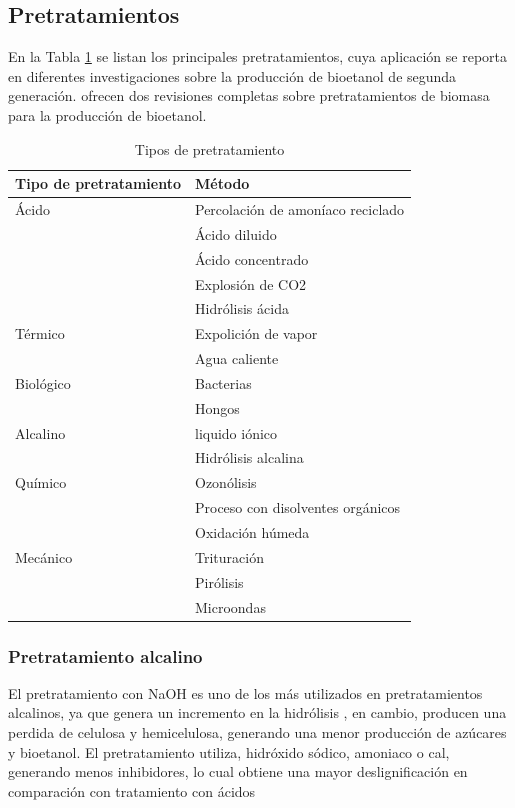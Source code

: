 \documentclass[12pt]{article}
\begin{document}
\begin{appendix}
		\subsection{Pretratamientos}
		En la Tabla \ref{tipos de pretratamientos} se listan los principales pretratamientos, cuya aplicación se reporta en diferentes investigaciones sobre la producción de bioetanol de segunda generación.%
		ofrecen dos revisiones completas sobre pretratamientos de biomasa para la producción de bioetanol.
		
		\begin{table}[H]
		\centering  
		\caption{Tipos de pretratamiento }%
		\begin{tabular}{  | p{5cm} | p{6.5cm} |}
		\hline\textbf{ Tipo de pretratamiento} & \textbf{ Método}\\ \hline 
		Ácido     & Percolación de amoníaco reciclado  \\ 
		&  Ácido diluido  \\
		&  Ácido concentrado \\
		&   Explosión de CO2  \\ 
		&   Hidrólisis ácida \\ \hline 
		Térmico   & Expolición de vapor\\
		&  Agua caliente \\ \hline
		Biológico & Bacterias \\
		&  Hongos \\ \hline
		Alcalino  & liquido iónico  \\
		& Hidrólisis alcalina \\ \hline
		Químico   & Ozonólisis\\
		&  Proceso con disolventes orgánicos\\
		& Oxidación húmeda \\ \hline
		Mecánico  & Trituración \\
		&  Pirólisis \\
		&  Microondas \\ \hline
		
		\end{tabular}
		\label{tipos de pretratamientos}
	\end{table}


\subsubsection{Pretratamiento alcalino}

El pretratamiento con NaOH es uno de los más utilizados en pretratamientos alcalinos,  ya que genera un incremento en la hidrólisis \cite{espinosa2021pretratamiento}, en cambio, producen una perdida de celulosa y hemicelulosa, generando una menor producción de azúcares y bioetanol.
El pretratamiento utiliza, hidróxido sódico, amoniaco o cal, generando menos inhibidores, lo cual obtiene una mayor deslignificación en comparación con tratamiento con ácidos %


\end{appendix}
\end{document}
